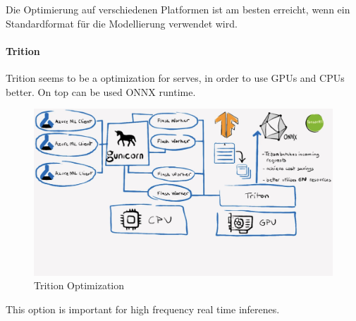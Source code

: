 Die Optimierung auf verschiedenen Platformen ist am besten erreicht, wenn ein Standardformat für die Modellierung verwendet wird.

\paragraph{Trition}
Trition seems to be a optimization for serves, in order to use \glspl{GPU} and \glspl{CPU} better. On top can be used \gls{ONNX} runtime.

\begin{figure}[H]
	\centering
	\includegraphics[scale = 0.2]{attachment/chapter_10/Scc019}
	\caption{Trition Optimization}
\end{figure}
This option is important for high frequency real time inferenes.



